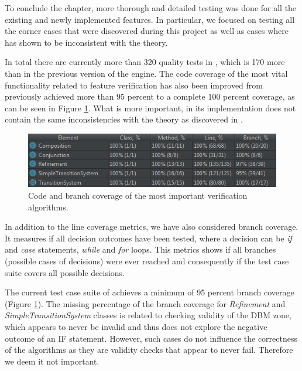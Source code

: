 To conclude the chapter, more thorough and detailed testing was done for all the existing and newly implemented features. In particular, we focused on testing all the corner cases that were discovered during this project as well as cases where  has shown to be inconsistent with the theory.

In total there are currently more than 320 quality tests in \jecdar, which is 170 more than in the previous version of the engine. The code coverage of the most vital functionality related to feature verification has also been improved from previously achieved more than 95 percent to a complete 100 percent coverage, as can be seen in Figure \ref{fig:code-coverage}. What is more important, in its implementation \jecdar does not contain the same inconsistencies with the theory as discovered in .

\begin{figure}
    \centering
    \includegraphics[scale = 0.7]{figures/code-coverage.png}
    \caption{Code and branch coverage of the most important verification algorithms.}
    \label{fig:code-coverage}
\end{figure}

In addition to the line coverage metrics, we have also considered branch coverage. It measures if all decision outcomes have been tested, where a decision can be \textit{if} and \textit{case} statements, \textit{while} and \textit{for} loops. This metrics shows if all branches (possible cases of decisions) were ever reached and consequently if the test case suite covers all possible decisions. 

The current test case suite of \jecdar achieves a minimum of 95 percent branch coverage (Figure \ref{fig:code-coverage}). The missing percentage of the branch coverage for \textit{Refinement} and \textit{SimpleTransitionSystem} classes is related to checking validity of the DBM zone, which appears to never be invalid and thus does not explore the negative outcome of an IF statement. However, such cases do not influence the correctness of the algorithms as they are validity checks that appear to never fail. Therefore we deem it not important.